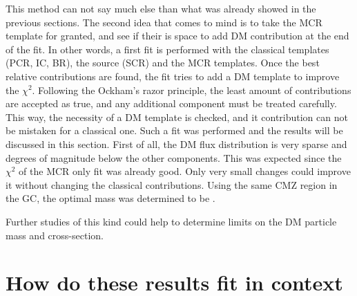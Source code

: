This method can not say much else than what was already showed in the previous sections. The second idea that comes to mind is to take the MCR template for granted, and see if their is space to add DM contribution at the end of the fit. In other words, a first fit is performed with the classical templates (PCR, IC, BR), the source (SCR) and the MCR templates. Once the best relative contributions are found, the fit tries to add a DM template to improve the $\chi^2$.
Following the Ockham's razor principle, the least amount of contributions are accepted as true, and any additional component must be treated carefully. This way, the necessity of a DM template is checked, and it contribution can not be mistaken for a classical one.
Such a fit was performed and the results will be discussed in this section. First of all, the DM flux distribution  is very sparse and degrees of magnitude below the other components. This was expected since the $\chi^2$ of the MCR only fit was already good. Only very small changes could improve it without changing the classical contributions. Using the same CMZ region in the GC, the optimal mass was determined to be .

Further studies of this kind could help to determine limits on the DM particle mass and cross-section.


\section{How do these results fit in context}
%		






